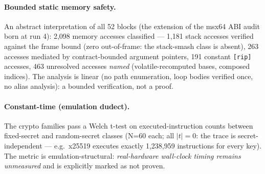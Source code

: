 \documentclass[11pt,a4paper]{article}
\newcommand{\code}[1]{\texttt{\small #1}}
\begin{document}
\paragraph{Bounded static memory safety.} An abstract interpretation of
all 52 blocks (the extension of the msx64 ABI audit born at run 4):
2{,}098 memory accesses classified --- 1{,}181 stack accesses verified
against the frame bound (zero out-of-frame: the stack-smash class is
absent), 263 accesses mediated by contract-bounded argument pointers, 191
constant \code{[rip]} accesses, 463 unresolved accesses \emph{named}
(volatile-recomputed bases, composed indices). The analysis is linear
(no path enumeration, loop bodies verified once, no alias analysis): a
bounded verification, not a proof.

\paragraph{Constant-time (emulation dudect).} The crypto families pass a
Welch t-test on executed-instruction counts between fixed-secret and
random-secret classes (N=60 each; all $|t| = 0$: the trace is
secret-independent --- e.g.\ x25519 executes exactly 1{,}238{,}959
instructions for every key). The metric is emulation-structural:
\emph{real-hardware wall-clock timing remains unmeasured} and is
explicitly marked as not proven.
\end{document}
